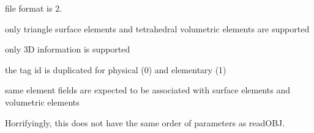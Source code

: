 \begin{DoxyRefList}
file format is 2. 



only triangle surface elements and tetrahedral volumetric elements are supported 



only 3D information is supported 



the tag id is duplicated for physical (0) and elementary (1) 



same element fields are expected to be associated with surface elements and volumetric elements  
\item[Member \doxylink{namespaceigl_a1a1761a85ec5cdef44ce8104d0ccdc3f}{igl\+::write\+OBJ} (const std\+::string str, const Eigen\+::\+Matrix\+Base$<$ Derived\+V $>$ \&V, const Eigen\+::\+Matrix\+Base$<$ Derived\+F $>$ \&F, const Eigen\+::\+Matrix\+Base$<$ Derived\+CN $>$ \&CN, const Eigen\+::\+Matrix\+Base$<$ Derived\+FN $>$ \&FN, const Eigen\+::\+Matrix\+Base$<$ Derived\+TC $>$ \&TC, const Eigen\+::\+Matrix\+Base$<$ Derived\+FTC $>$ \&FTC)]\label{bug__bug000024}%
%
Horrifyingly, this does not have the same order of parameters as read\+OBJ.
\end{DoxyRefList}